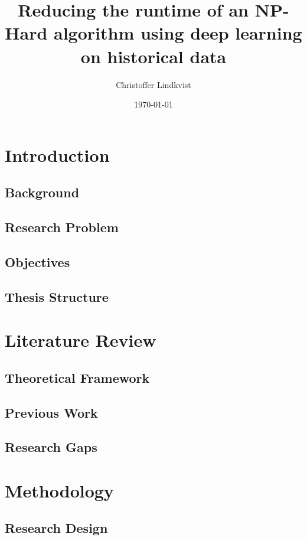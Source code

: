 \documentclass[12pt,a4paper]{report}
\begin{document}
\title{Reducing the runtime of an NP-Hard algorithm using deep learning on historical data}
\author{Christoffer Lindkvist}
\date{\today}
\maketitle

\begin{abstract}
\lipsum[1] 
\end{abstract}

\tableofcontents
\listoffigures
\listoftables

\chapter{Introduction}
\section{Background}
\section{Research Problem}
\section{Objectives}
\section{Thesis Structure}

\chapter{Literature Review}
\section{Theoretical Framework}
\section{Previous Work}
\section{Research Gaps}

\chapter{Methodology}
\section{Research Design}
\end{document}
